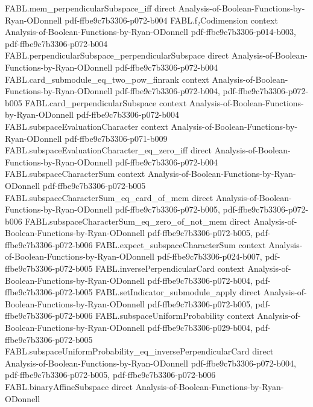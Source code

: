 \begin{theorem}
\proofstep
  {FABL.mem_perpendicularSubspace_iff}
  {direct}
  {Analysis-of-Boolean-Functions-by-Ryan-ODonnell}
  {pdf-ffbe9c7b3306-p072-b004}
\proofstep
  {FABL.f₂Codimension}
  {context}
  {Analysis-of-Boolean-Functions-by-Ryan-ODonnell}
  {pdf-ffbe9c7b3306-p014-b003,
    pdf-ffbe9c7b3306-p072-b004}
\proofstep
  {FABL.perpendicularSubspace_perpendicularSubspace}
  {direct}
  {Analysis-of-Boolean-Functions-by-Ryan-ODonnell}
  {pdf-ffbe9c7b3306-p072-b004}
\proofstep
  {FABL.card_submodule_eq_two_pow_finrank}
  {context}
  {Analysis-of-Boolean-Functions-by-Ryan-ODonnell}
  {pdf-ffbe9c7b3306-p072-b004,
    pdf-ffbe9c7b3306-p072-b005}
\proofstep
  {FABL.card_perpendicularSubspace}
  {context}
  {Analysis-of-Boolean-Functions-by-Ryan-ODonnell}
  {pdf-ffbe9c7b3306-p072-b004}
\proofstep
  {FABL.subspaceEvaluationCharacter}
  {context}
  {Analysis-of-Boolean-Functions-by-Ryan-ODonnell}
  {pdf-ffbe9c7b3306-p071-b009}
\proofstep
  {FABL.subspaceEvaluationCharacter_eq_zero_iff}
  {direct}
  {Analysis-of-Boolean-Functions-by-Ryan-ODonnell}
  {pdf-ffbe9c7b3306-p072-b004}
\proofstep
  {FABL.subspaceCharacterSum}
  {context}
  {Analysis-of-Boolean-Functions-by-Ryan-ODonnell}
  {pdf-ffbe9c7b3306-p072-b005}
\proofstep
  {FABL.subspaceCharacterSum_eq_card_of_mem}
  {direct}
  {Analysis-of-Boolean-Functions-by-Ryan-ODonnell}
  {pdf-ffbe9c7b3306-p072-b005,
    pdf-ffbe9c7b3306-p072-b006}
\proofstep
  {FABL.subspaceCharacterSum_eq_zero_of_not_mem}
  {direct}
  {Analysis-of-Boolean-Functions-by-Ryan-ODonnell}
  {pdf-ffbe9c7b3306-p072-b005,
    pdf-ffbe9c7b3306-p072-b006}
\proofstep
  {FABL.expect_subspaceCharacterSum}
  {context}
  {Analysis-of-Boolean-Functions-by-Ryan-ODonnell}
  {pdf-ffbe9c7b3306-p024-b007,
    pdf-ffbe9c7b3306-p072-b005}
\proofstep
  {FABL.inversePerpendicularCard}
  {context}
  {Analysis-of-Boolean-Functions-by-Ryan-ODonnell}
  {pdf-ffbe9c7b3306-p072-b004,
    pdf-ffbe9c7b3306-p072-b005}
\proofstep
  {FABL.setIndicator_submodule_apply}
  {direct}
  {Analysis-of-Boolean-Functions-by-Ryan-ODonnell}
  {pdf-ffbe9c7b3306-p072-b005,
    pdf-ffbe9c7b3306-p072-b006}
\proofstep
  {FABL.subspaceUniformProbability}
  {context}
  {Analysis-of-Boolean-Functions-by-Ryan-ODonnell}
  {pdf-ffbe9c7b3306-p029-b004,
    pdf-ffbe9c7b3306-p072-b005}
\proofstep
  {FABL.subspaceUniformProbability_eq_inversePerpendicularCard}
  {direct}
  {Analysis-of-Boolean-Functions-by-Ryan-ODonnell}
  {pdf-ffbe9c7b3306-p072-b004,
    pdf-ffbe9c7b3306-p072-b005,
    pdf-ffbe9c7b3306-p072-b006}
\proofstep
  {FABL.binaryAffineSubspace}
  {direct}
  {Analysis-of-Boolean-Functions-by-Ryan-ODonnell}

\end{theorem}
